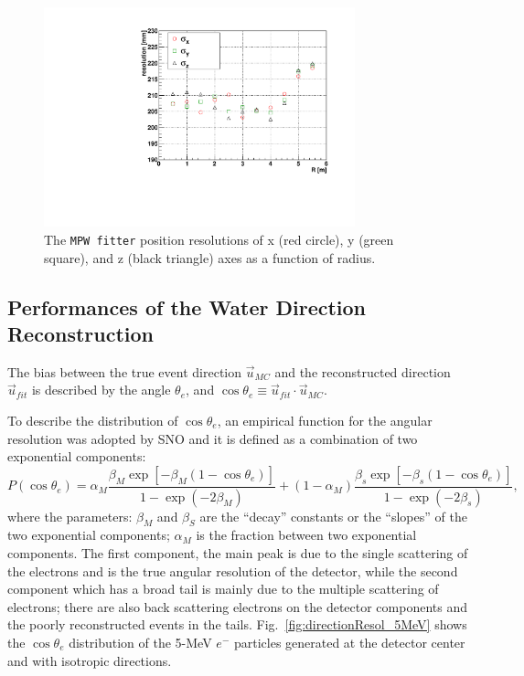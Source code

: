 \begin{figure}[htbp]
	\centering	
	\includegraphics[width=9cm]{shellTest_RvsResol.pdf}
	\caption[The \texttt{MPW fitter} position resolutions ($\sigma_{x,y,z}$) as a function of energies.]{The \texttt{MPW fitter} position resolutions of x (red circle), y (green square), and z (black triangle) axes as a function of radius.}
	\label{fig:FitResolVsShell}
\end{figure}
 
\subsection{Performances of the Water Direction Reconstruction}\label{sect:directResol}
The bias between the true event direction $\vec{u}_{MC}$ and the reconstructed direction $\vec{u}_{fit}$ is described by the angle $\theta_e$, and $\cos\theta_e\equiv\vec{u}_{fit}\cdot\vec{u}_{MC}$.

To describe the distribution of $\cos\theta_e$, an empirical function for the angular resolution was adopted by SNO\cite{boulay2004direct} and it is defined as a combination of two exponential components:
\begin{equation}\label{eq:directResol}
P(\cos\theta_e)=\alpha_M\frac{\beta_M\exp[-\beta_M(1-\cos\theta_e)]}{1-\exp(-2\beta_M)}+(1-\alpha_M)\frac{\beta_s\exp[-\beta_s(1-\cos\theta_e)]}{1-\exp(-2\beta_s)},
\end{equation}
where the parameters: $\beta_M$ and $\beta_S$ are the ``decay'' constants or the ``slopes'' of the two exponential components; $\alpha_M$ is the fraction between two exponential components. The first component, the main peak is due to the single scattering of the electrons and is the true angular resolution of the detector, while the second component which has a broad tail is mainly due to the multiple scattering of electrons; there are also back scattering electrons on the detector components and the poorly reconstructed events in the tails\cite{boulay2004direct}. Fig.~\ref{fig:directionResol_5MeV} shows the $\cos\theta_e$ distribution of the 5-MeV $e^-$ particles generated at the detector center and with isotropic directions.

